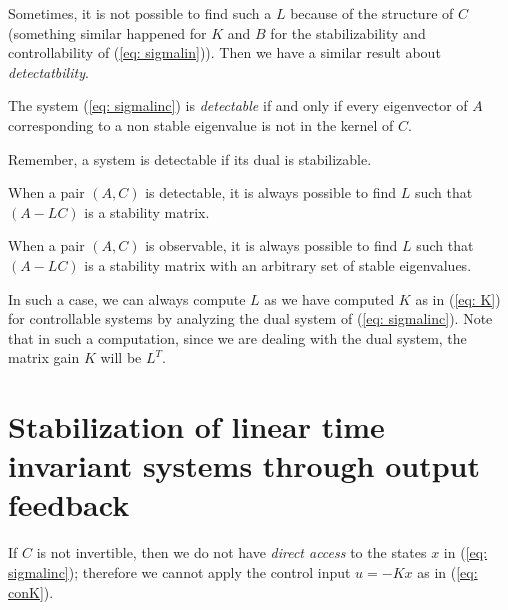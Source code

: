 Sometimes, it is not possible to find such a $L$ because of the structure of $C$ (something similar happened for $K$ and $B$ for the stabilizability and controllability of (\ref{eq: sigmalin})). Then we have a similar result about \emph{detectatbility}.
\begin{theorem}
	The system (\ref{eq: sigmalinc}) is \emph{detectable} if and only if every eigenvector of $A$ corresponding to a non stable eigenvalue is not in the kernel of $C$.
\end{theorem}
Remember, a system is detectable if its dual is stabilizable.
\begin{theorem}
	When a pair $(A,C)$ is detectable, it is always possible to find $L$ such that $(A-LC)$ is a stability matrix.
\end{theorem}
\begin{theorem}
	When a pair $(A,C)$ is observable, it is always possible to find $L$ such that $(A-LC)$ is a stability matrix with an arbitrary set of stable eigenvalues.
\end{theorem}
In such a case, we can always compute $L$ as we have computed $K$ as in (\ref{eq: K}) for controllable systems by analyzing the dual system of (\ref{eq: sigmalinc}). Note that in such a computation, since we are dealing with the dual system, the matrix gain $K$ will be $L^T$.

\section{Stabilization of linear time invariant systems through output feedback}
If $C$ is not invertible, then we do not have \emph{direct access} to the states $x$ in (\ref{eq: sigmalinc}); therefore we cannot apply the control input $u = -Kx$ as in (\ref{eq: conK}).

